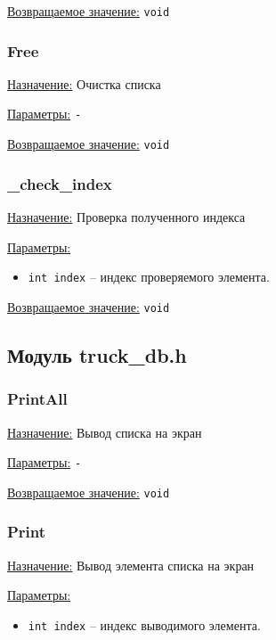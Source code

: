 \underline{Возвращаемое значение:} \verb|void|


\subsubsection*{Free}

\underline{Назначение:} Очистка списка

\underline{Параметры:} \verb|-|

\underline{Возвращаемое значение:} \verb|void|


\subsubsection*{\_check\_index}

\underline{Назначение:} Проверка полученного индекса

\underline{Параметры:} 

\begin{itemize}
    \item \verb|int index| -- индекс проверяемого элемента.
\end{itemize}

\underline{Возвращаемое значение:} \verb|void|


\subsection*{Модуль truck\_db.h}


\subsubsection*{PrintAll}

\underline{Назначение:} Вывод списка на экран

\underline{Параметры:} \verb|-|

\underline{Возвращаемое значение:} \verb|void|


\subsubsection*{Print}

\underline{Назначение:} Вывод элемента списка на экран

\underline{Параметры:} 

\begin{itemize}
    \item \verb|int index| -- индекс выводимого элемента.
\end{itemize}

